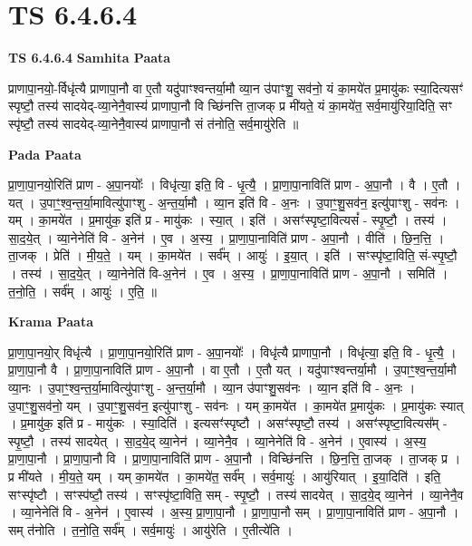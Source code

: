 \documentclass[17pt]{extarticle}
\begin{document}
\section{ TS 6.4.6.4 }

\textbf{TS 6.4.6.4 } \newline
\textbf{Samhita Paata} \newline

प्राणापा॒नयो॒-र्विधृ॑त्यै प्राणापा॒नौ वा ए॒तौ यदु॑पाꣳश्वन्तर्या॒मौ व्या॒न उ॑पाꣳशु॒ सव॑नो॒ यं का॒मये॑त प्र॒मायु॑कः स्या॒दित्यसꣳ॑ स्पृष्टौ॒ तस्य॑ सादयेद्-व्या॒नेनै॒वास्य॑ प्राणापा॒नौ वि च्छि॑नत्ति ता॒जक् प्र मी॑यते॒ यं का॒मये॑त॒ सर्व॒मायु॑रिया॒दिति॒ सꣳ स्पृ॑ष्टौ॒ तस्य॑ सादयेद्-व्या॒नेनै॒वास्य॑ प्राणापा॒नौ सं त॑नोति॒ सर्व॒मायु॑रेति ॥ \newline

\textbf{Pada Paata} \newline

प्रा॒णा॒पा॒नयो॒रिति॑ प्राण - अ॒पा॒नयोः᳚ । विधृ॑त्या॒ इति॒ वि - धृ॒त्यै॒ । प्रा॒णा॒पा॒नाविति॑ प्राण - अ॒पा॒नौ । वै । ए॒तौ । यत् । उ॒पाꣳ॒॒श्व॒न्त॒र्या॒मावित्यु॑पाꣳशु - अ॒न्त॒र्या॒मौ । व्या॒न इति॑ वि - अ॒नः । उ॒पाꣳ॒॒शु॒सव॑न॒ इत्यु॑पाꣳशु - सव॑नः । यम् । का॒मये॑त । प्र॒मायु॑क॒ इति॑ प्र - मायु॑कः । स्या॒त् । इति॑ । असꣳ॑स्पृष्टा॒वित्यसं᳚ - स्पृ॒ष्टौ॒ । तस्य॑ । सा॒द॒ये॒त् । व्या॒नेनेति॑ वि - अ॒नेन॑ । ए॒व । अ॒स्य॒ । प्रा॒णा॒पा॒नाविति॑ प्राण - अ॒पा॒नौ । वीति॑ । छि॒न॒त्ति॒ । ता॒जक् । प्रेति॑ । मी॒य॒ते॒ । यम् । का॒मये॑त । सर्व᳚म् । आयुः॑ । इ॒या॒त् । इति॑ । सꣳस्पृ॑ष्टा॒विति॒ सं-स्पृ॒ष्टौ॒ । तस्य॑ । सा॒द॒ये॒त् । व्या॒नेनेति॑ वि-अ॒नेन॑ । ए॒व । अ॒स्य॒ । प्रा॒णा॒पा॒नाविति॑ प्राण - अ॒पा॒नौ । समिति॑ । त॒नो॒ति॒ । सर्व᳚म् । आयुः॑ । ए॒ति॒ ॥  \newline


\textbf{Krama Paata} \newline

प्रा॒णा॒पा॒नयो॒र् विधृ॑त्यै । प्रा॒णा॒पा॒नयो॒रिति॑ प्राण - अ॒पा॒नयोः᳚ । विधृ॑त्यै प्राणापा॒नौ । विधृ॑त्या॒ इति॒ वि - धृ॒त्यै॒ । प्रा॒णा॒पा॒नौ वै । प्रा॒णा॒पा॒नाविति॑ प्राण - अ॒पा॒नौ । वा ए॒तौ । ए॒तौ यत् । यदु॑पाꣳश्वन्तर्या॒मौ । उ॒पाꣳ॒॒श्व॒न्त॒र्या॒मौ व्या॒नः । उ॒पाꣳ॒॒श्व॒न्त॒र्या॒मावित्यु॑पाꣳशु - अ॒न्त॒र्या॒मौ । व्या॒न उ॑पाꣳशु॒सव॑नः । व्या॒न इति॑ वि - अ॒नः । उ॒पाꣳ॒॒शु॒सव॑नो॒ यम् । उ॒पाꣳ॒॒शु॒सव॑न॒ इत्यु॑पाꣳशु - सव॑नः । यम् का॒मये॑त । का॒मये॑त प्र॒मायु॑कः । प्र॒मायु॑कः स्यात् । प्र॒मायु॑क॒ इति॑ प्र - मायु॑कः । स्या॒दिति॑ । इत्यसꣳ॑स्पृष्टौ । असꣳ॑स्पृष्टौ॒ तस्य॑ । असꣳ॑स्पृष्टा॒वित्यस᳚म् - स्पृ॒ष्टौ॒ । तस्य॑ सादयेत् । सा॒द॒ये॒द् व्या॒नेन॑ । व्या॒नेनै॒व । व्या॒नेनेति॑ वि - अ॒नेन॑ । ए॒वास्य॑ । अ॒स्य॒ प्रा॒णा॒पा॒नौ । प्रा॒णा॒पा॒नौ वि । प्रा॒णा॒पा॒नाविति॑ प्राण - अ॒पा॒नौ । विच्छि॑नत्ति । छि॒न॒त्ति॒ ता॒जक् । ता॒जक् प्र । प्र मी॑यते । मी॒य॒ते॒ यम् । यम् का॒मये॑त । का॒मये॑त॒ सर्व᳚म् । सर्व॒मायुः॑ । आयु॑रियात् । इ॒या॒दिति॑ । इति॒ सꣳस्पृ॑ष्टौ । सꣳस्प॑ष्टौ॒ तस्य॑ । सꣳस्पृ॑ष्टा॒विति॒ सम् - स्पृ॒ष्टौ॒ । तस्य॑ सादयेत् । सा॒द॒ये॒द् व्या॒नेन॑ । व्या॒नेनै॒व । व्या॒नेनेति॑ वि - अ॒नेन॑ । ए॒वास्य॑ । अ॒स्य॒ प्रा॒णा॒पा॒नौ । प्रा॒णा॒पा॒नौ सम् । प्रा॒णा॒पा॒नाविति॑ प्राण - अ॒पा॒नौ । सम् त॑नोति । त॒नो॒ति॒ सर्व᳚म् । सर्व॒मायुः॑ । आयु॑रेति । ए॒तीत्ये॑ति । \newline
\end{document}
